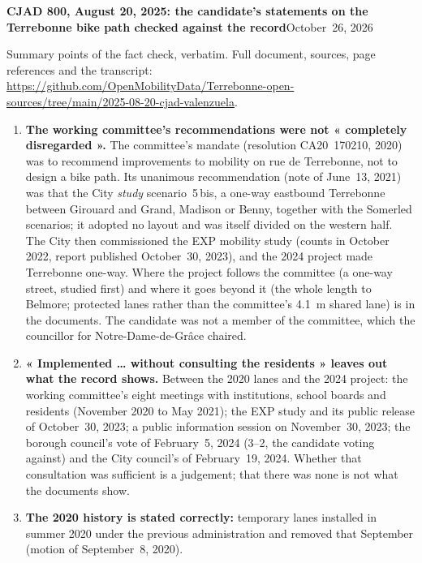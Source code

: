 \documentclass[10pt,letterpaper]{article}
\newcommand{\repourl}{https://github.com/OpenMobilityData/Terrebonne-open-sources}
\begin{document}
{\large\bfseries CJAD 800, August 20, 2025: the candidate's statements on the Terrebonne bike path checked against the record}\hfill{\small October~26, 2026}

\vspace{-0.2em}
{\small Summary points of the fact check, verbatim. Full document, sources, page references and the transcript:\\ \href{\repourl/tree/main/2025-08-20-cjad-valenzuela}{\repourl/tree/main/2025-08-20-cjad-valenzuela}.}
\vspace{0.4em}

\begin{enumerate}[nosep,itemsep=0.3em,leftmargin=1.4em]
\item \textbf{The working committee's recommendations were not « completely disregarded ».} The committee's mandate (resolution CA20~170210, 2020) was to recommend improvements to mobility on rue de Terrebonne, not to design a bike path. Its unanimous recommendation (note of June~13, 2021) was that the City \emph{study} scenario~5\,bis, a one-way eastbound Terrebonne between Girouard and Grand, Madison or Benny, together with the Somerled scenarios; it adopted no layout and was itself divided on the western half. The City then commissioned the EXP mobility study (counts in October 2022, report published October~30, 2023), and the 2024 project made Terrebonne one-way. Where the project follows the committee (a one-way street, studied first) and where it goes beyond it (the whole length to Belmore; protected lanes rather than the committee's 4.1~m shared lane) is in the documents. The candidate was not a member of the committee, which the councillor for Notre-Dame-de-Grâce chaired.
\item \textbf{« Implemented … without consulting the residents » leaves out what the record shows.} Between the 2020 lanes and the 2024 project: the working committee's eight meetings with institutions, school boards and residents (November 2020 to May 2021); the EXP study and its public release of October~30, 2023; a public information session on November~30, 2023; the borough council's vote of February~5, 2024 (3--2, the candidate voting against) and the City council's of February~19, 2024. Whether that consultation was sufficient is a judgement; that there was none is not what the documents show.
\item \textbf{The 2020 history is stated correctly:} temporary lanes installed in summer 2020 under the previous administration and removed that September (motion of September~8, 2020).

\end{enumerate}
\end{document}
